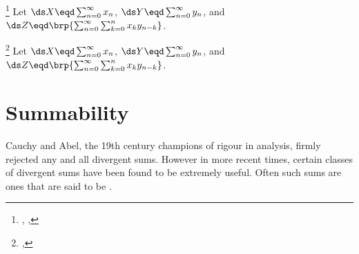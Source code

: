 \begin{theorem}
\footnote{
  ,
  ,
  }
Let $\ds X\eqd\sum_{n=0}^\infty x_n$,
    $\ds Y\eqd\sum_{n=0}^\infty y_n$, and
    $\ds Z\eqd\brp{\sum_{n=0}^\infty\sum_{k=0}^n x_k y_{n-k}}$.
\end{theorem}

\begin{theorem}
\footnote{
  ,
  }
Let $\ds X\eqd\sum_{n=0}^\infty x_n$,
    $\ds Y\eqd\sum_{n=0}^\infty y_n$, and
    $\ds Z\eqd\brp{\sum_{n=0}^\infty\sum_{k=0}^n x_k y_{n-k}}$.
\end{theorem}

\section{Summability}
Cauchy and Abel, the 19th century champions of rigour in analysis, firmly rejected any and all divergent sums.
However in more recent times, certain classes of divergent sums have been found to be extremely useful.
Often such sums are ones that are said to be . %

